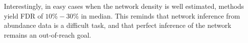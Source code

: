 Interestingly, in easy cases when the network density is well estimated, methods yield FDR of $10\%-30\%$ in median. This reminds that network inference from abundance data is a difficult task, and that perfect inference of the network remains an out-of-reach goal. 
 

